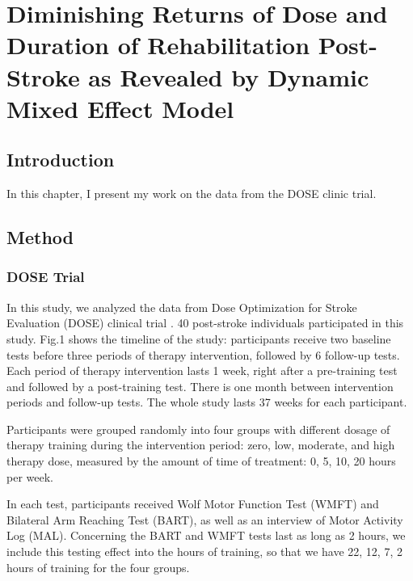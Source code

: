 \chapter{Diminishing Returns of Dose and Duration of Rehabilitation Post-Stroke as Revealed by Dynamic Mixed Effect Model}
\label{dosechapter}


\section{Introduction}
In this chapter, I present my work on the data from the DOSE clinic trial.


\section{Method}
\subsection{DOSE Trial}
In this study, we analyzed the data from Dose Optimization for Stroke Evaluation (DOSE) clinical trial \cite{}. 
40 post-stroke individuals participated in this study. 
Fig.1 shows the timeline of the study: participants receive two baseline tests before three periods of therapy intervention, followed by 6 follow-up tests. 
Each period of therapy intervention lasts 1 week, right after a pre-training test and followed by a post-training test. 
There is one month between intervention periods and follow-up tests. 
The whole study lasts 37 weeks for each participant.
  
Participants were grouped randomly into four groups with different dosage of therapy training during the intervention period: zero, low, moderate, and high therapy dose, measured by the amount of time of treatment: 0, 5, 10, 20 hours per week.

In each test, participants received Wolf Motor Function Test (WMFT) and Bilateral Arm Reaching Test (BART), as well as an interview of Motor Activity Log (MAL). 
Concerning the BART and WMFT tests last as long as 2 hours, we include this testing effect into the hours of training, so that we have 22, 12, 7, 2 hours of training for the four groups.

